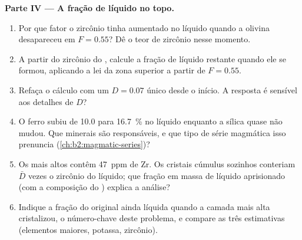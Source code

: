 \begin{problem}
\noindent\textbf{Parte IV --- A fração de líquido no topo.}
\begin{enumerate}[resume]
\item Por que fator o zircônio tinha aumentado no líquido quando a olivina desapareceu em
$F = 0.55$? Dê o teor de zircônio nesse momento.
\item A partir do zircônio do , calcule a fração de líquido restante quando
ele se formou, aplicando a lei da zona superior a partir de $F = 0.55$.
\item Refaça o cálculo com um $D = 0.07$ único desde o início. A resposta é
sensível aos detalhes de $D$?
\item O ferro subiu de 10.0 para \qty{16.7}{\percent} no líquido enquanto a sílica quase não
mudou. Que minerais são responsáveis, e que tipo de série magmática
isso prenuncia (\cref{ch:b2:magmatic-series})?
\item Os  mais altos contêm \qty{47}{ppm} de Zr. Os cristais cúmulus sozinhos conteriam
$\bar D$ vezes o zircônio do líquido; que fração em massa de líquido aprisionado
(com a composição do ) explica a análise?
\item Indique a fração do  original ainda líquida quando a camada mais alta
cristalizou, o número-chave deste problema, e compare as três estimativas
(elementos maiores, potassa, zircônio).
\end{enumerate}
\end{problem}
